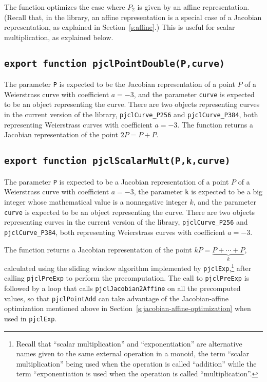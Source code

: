 \documentclass[12pt]{article}
\begin{document}
The function optimizes the case where $P_2$ is given by an affine
representation.  (Recall that, in the library, an affine representation 
is a special case of a Jacobian representation, as explained in Section~\ref{s:affine}.)  This is useful for scalar multiplication,
as explained below.

\subsection{\tt export function pjclPointDouble(P,curve)}

The parameter {\tt P} is expected to be the Jacobian representation of
a point $P$ of a Weierstrass curve with coefficient $a=-3$, and the parameter {\tt curve} is expected to be an object representing the curve.  There are two objects representing curves in the current version of the library, {\tt pjclCurve\_P256} and {\tt pjclCurve\_P384}, both representing Weierstrass curves with coefficient $a=-3$.
The function returns a Jacobian representation of the point
$2P=P+P$.

\subsection{\tt export function pjclScalarMult(P,k,curve)}
\label{s:scalar-mult}

The parameter {\tt P} is expected to be a Jacobian representation of
a point $P$ of a Weierstrass curve with coefficient $a=-3$,
the parameter {\tt k} is expected to be a big
integer whose mathematical value is a nonnegative integer $k$, and the parameter {\tt curve} is expected to be an object representing the curve.  There are two objects representing curves in the current version of the library, {\tt pjclCurve\_P256} and {\tt pjclCurve\_P384}, both representing Weierstrass curves with coefficient $a=-3$.

The function returns a Jacobian representation of the point
$kP=\underbrace{P+\cdots+P}_k$, calculated using the sliding window 
algorithm implemented by {\tt pjclExp},\footnote{Recall that ``scalar multiplication'' and ``exponentiation'' are alternative names given
to the same external operation in a monoid, the term ``scalar multiplication''
being used when the operation is called ``addition'' while the term
``exponentiation is used when the operation is called
``multiplication''.} after calling {\tt pjclPreExp} to perform the precomputation.
The call to {\tt pjclPreExp} is followed by a loop that calls {\tt pjclJacobian2Affine} on 
all the precomputed values, so that {\tt pjclPointAdd} can take advantage of the 
Jacobian-affine optimization mentioned above in Section~\ref{s:jacobian-affine-optimization}
when used in {\tt pjclExp}.
\end{document}
